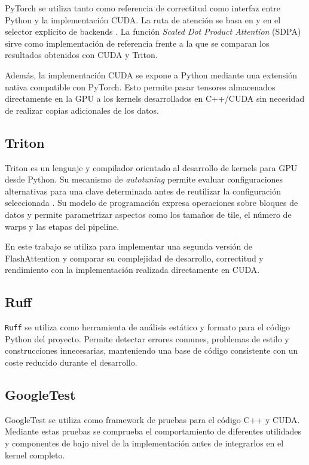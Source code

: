 PyTorch se utiliza tanto como referencia de correctitud como interfaz entre Python y la implementación CUDA. La ruta de atención se basa en  y en el selector explícito de backends  \cite{pytorchSDPA}. La función \textit{Scaled Dot Product Attention} (SDPA) sirve como implementación de referencia frente a la que se comparan los resultados obtenidos con CUDA y Triton.

Además, la implementación CUDA se expone a Python mediante una extensión nativa compatible con PyTorch. Esto permite pasar tensores almacenados directamente en la GPU a los kernels desarrollados en C++/CUDA sin necesidad de realizar copias adicionales de los datos.

\subsection{Triton}

Triton es un lenguaje y compilador orientado al desarrollo de kernels para GPU desde Python. Su mecanismo de \textit{autotuning} permite evaluar configuraciones alternativas para una clave determinada antes de reutilizar la configuración seleccionada \cite{tritonAutotune}. Su modelo de programación expresa operaciones sobre bloques de datos y permite parametrizar aspectos como los tamaños de tile, el número de warps y las etapas del pipeline.

En este trabajo se utiliza para implementar una segunda versión de FlashAttention y comparar su complejidad de desarrollo, correctitud y rendimiento con la implementación realizada directamente en CUDA.

\subsection{Ruff}

\texttt{Ruff} se utiliza como herramienta de análisis estático y formato para el código Python del proyecto. Permite detectar errores comunes, problemas de estilo y construcciones innecesarias, manteniendo una base de código consistente con un coste reducido durante el desarrollo.

\subsection{GoogleTest}

GoogleTest se utiliza como framework de pruebas para el código C++ y CUDA. Mediante estas pruebas se comprueba el comportamiento de diferentes utilidades y componentes de bajo nivel de la implementación antes de integrarlos en el kernel completo.


